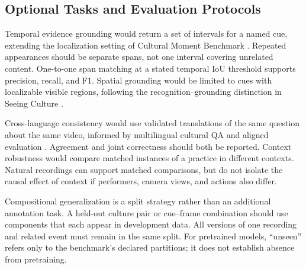 \subsection{Optional Tasks and Evaluation Protocols}
\label{sec:optional-tasks}
Temporal evidence grounding would return a set of intervals for a named cue, extending the localization setting of Cultural Moment Benchmark \citep{satar-etal-2026-cultural}.
Repeated appearances should be separate spans, not one interval covering unrelated content.
One-to-one span matching at a stated temporal IoU threshold supports precision, recall, and F1.
Spatial grounding would be limited to cues with localizable visible regions, following the recognition--grounding distinction in Seeing Culture \citep{satar-etal-2025-seeing}.

Cross-language consistency would use validated translations of the same question about the same video, informed by multilingual cultural QA and aligned evaluation \citep{romero2024cvqa,zheng-etal-2026-mmac}.
Agreement and joint correctness should both be reported.
Context robustness would compare matched instances of a practice in different contexts.
Natural recordings can support matched comparisons, but do not isolate the causal effect of context if performers, camera views, and actions also differ.

Compositional generalization is a split strategy rather than an additional annotation task.
A held-out culture pair or cue--frame combination should use components that each appear in development data.
All versions of one recording and related event must remain in the same split.
For pretrained models, ``unseen'' refers only to the benchmark's declared partitions; it does not establish absence from pretraining.
